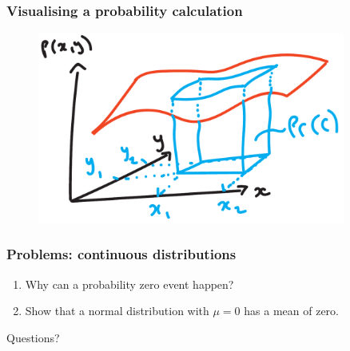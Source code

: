 \documentclass{beamer}
\begin{document}
	\begin{frame}
		\frametitle{Visualising a probability calculation}
		
		\begin{figure}[ht]
			\centerline{\includegraphics[width=0.9\textwidth]{./figures/multivariate_continuous_volume.pdf}}
		\end{figure}
		
	\end{frame}
	
	\begin{frame}
		
		\frametitle{Problems: continuous distributions}
		
		\begin{enumerate}
			\item Why can a probability zero event happen?
			\item Show that a normal distribution with $\mu=0$ has a mean of zero.
		\end{enumerate}

	\end{frame}
	
	
	\begin{frame}
		\Large Questions?
	\end{frame}
	
\end{document}
